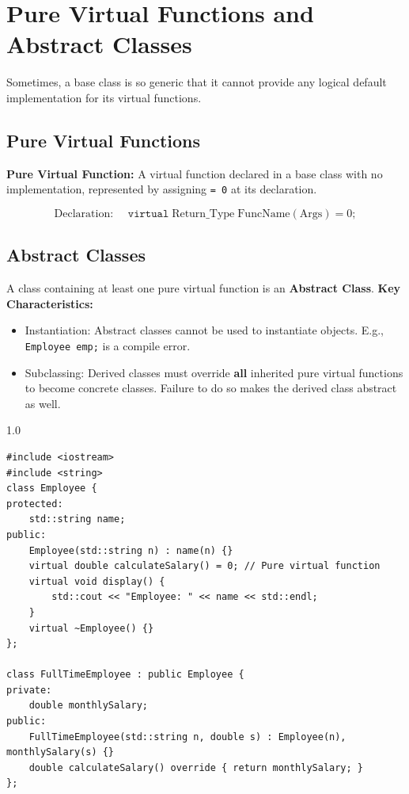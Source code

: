 \documentclass[12pt,a4paper]{article}
\begin{document}
\section{Pure Virtual Functions and Abstract Classes}

Sometimes, a base class is so generic that it cannot provide any logical default implementation for its virtual functions.

\subsection{Pure Virtual Functions}
\begin{tcolorbox}[defbox]
\textbf{Pure Virtual Function:} A virtual function declared in a base class with no implementation, represented by assigning \texttt{= 0} at its declaration.
\end{tcolorbox}
\begin{equation}
  \text{Declaration: } \quad \texttt{virtual}\;\text{Return\_Type}\;\text{FuncName}(\text{Args}) = 0;
\end{equation}

\subsection{Abstract Classes}
A class containing at least one pure virtual function is an \textbf{Abstract Class}.
\textbf{Key Characteristics:}
\begin{itemize}[leftmargin=*, itemsep=2.5pt]
  \item Instantiation: Abstract classes cannot be used to instantiate objects. E.g., \texttt{Employee emp;} is a compile error.
  \item Subclassing: Derived classes must override \textbf{all} inherited pure virtual functions to become concrete classes. Failure to do so makes the derived class abstract as well.
\end{itemize}

\begin{tcolorbox}[examplebox, title={Code Example: Abstract Employee base class}]
\begin{spacing}{1.0}
\begin{verbatim}
#include <iostream>
#include <string>
class Employee {
protected:
    std::string name;
public:
    Employee(std::string n) : name(n) {}
    virtual double calculateSalary() = 0; // Pure virtual function
    virtual void display() {
        std::cout << "Employee: " << name << std::endl;
    }
    virtual ~Employee() {}
};

class FullTimeEmployee : public Employee {
private:
    double monthlySalary;
public:
    FullTimeEmployee(std::string n, double s) : Employee(n), monthlySalary(s) {}
    double calculateSalary() override { return monthlySalary; }
};
\end{verbatim}
\end{spacing}
\end{tcolorbox}
\end{document}
